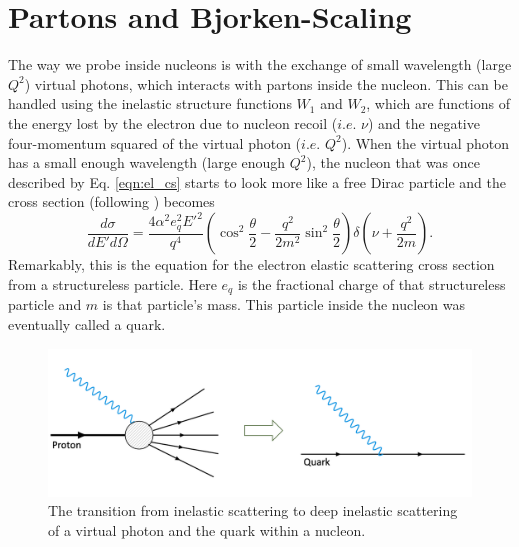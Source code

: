 \section{Partons and Bjorken-Scaling}
The way we probe inside nucleons is with the exchange of small wavelength (large $Q^2$) virtual photons, which interacts with partons inside the nucleon. This can be handled using the inelastic structure functions $W_1$ and $W_2$, which are functions of the energy lost by the electron due to nucleon recoil ($i.e.$ $\nu$) and the negative four-momentum squared of the virtual photon ($i.e.$ $Q^2$). When the virtual photon has a small enough wavelength (large enough $Q^2$), the nucleon that was once described by Eq. \ref{eqn:el_cs} starts to look more like a free Dirac particle and the cross section (following \cite{book:halzen}) becomes
\begin{equation}
\label{eqn:quark_scatt}
\frac{d\sigma}{dE'd\Omega} = \frac{4 \alpha^2 e_q^2 E'^2}{q^4} \left( \cos^2 \frac{\theta}{2} - \frac{q^2}{2m^2}\sin^2 \frac{\theta}{2} \right) \delta \left( \nu + \frac{q^2}{2m} \right).
\end{equation} 
Remarkably, this is the equation for the electron elastic scattering cross section from a structureless particle\cite{book:halzen}. Here $e_q$ is the fractional charge of that structureless particle and $m$ is that particle's mass. This particle inside the nucleon was eventually called a quark.

\begin{figure}[h!]
	\centering
	\includegraphics[width=0.9\linewidth]{figures/inel_to_dis.png}
	\caption{The transition from inelastic scattering to deep inelastic scattering of a virtual photon and the quark within a nucleon.}
	\label{fig:feyn_inel_to_dis}
\end{figure}

